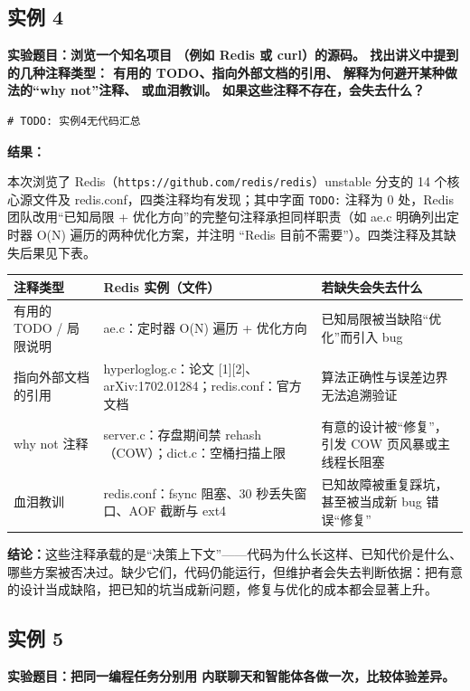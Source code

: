 \documentclass[12pt,a4paper]{article}
\newcounter{picnum}
\newcommand{\resetpic}{\setcounter{picnum}{0}}
\begin{document}
\subsection*{实例 4}
\resetpic
\textbf{实验题目：浏览一个知名项目
（例如 Redis 或 curl）的源码。 
找出讲义中提到的几种注释类型：
有用的 TODO、指向外部文档的引用、
解释为何避开某种做法的“why not”注释、
或血泪教训。 如果这些注释不存在，会失去什么？
}

\begin{lstlisting}
# TODO: 实例4无代码汇总
\end{lstlisting}

\textbf{结果：}

本次浏览了 Redis（\texttt{https://github.com/redis/redis}）unstable 分支的 14 个核心源文件及 redis.conf，四类注释均有发现；其中字面 \texttt{TODO:} 
注释为 0 处，Redis 团队改用``已知局限 + 优化方向''的完整句注释承担同样职责（如 ae.c 明确列出定时器 O(N) 遍历的两种优化方案，并注明 ``Redis 目前不需要''）。四类注释及其缺失后果见下表。

\begin{tabular}{p{2.8cm}p{4.6cm}p{5.4cm}}
\toprule
注释类型 & Redis 实例（文件） & 若缺失会失去什么 \\
\midrule
有用的 TODO / 局限说明 & ae.c：定时器 O(N) 遍历 + 优化方向 & 已知局限被当缺陷``优化''而引入 bug \\
\addlinespace
指向外部文档的引用 & hyperloglog.c：论文 [1][2]、arXiv:1702.01284；redis.conf：官方文档 & 算法正确性与误差边界无法追溯验证 \\
\addlinespace
why not 注释 & server.c：存盘期间禁 rehash（COW）；dict.c：空桶扫描上限 & 有意的设计被``修复''，引发 COW 页风暴或主线程长阻塞 \\
\addlinespace
血泪教训 & redis.conf：fsync 阻塞、30 秒丢失窗口、AOF 截断与 ext4 & 已知故障被重复踩坑，甚至被当成新 bug 错误``修复'' \\
\bottomrule
\end{tabular}

\textbf{结论：}这些注释承载的是``决策上下文''——代码为什么长这样、已知代价是什么、哪些方案被否决过。缺少它们，代码仍能运行，但维护者会失去判断依据：把有意的设计当成缺陷，把已知的坑当成新问题，修复与优化的成本都会显著上升。

\subsection*{实例 5}
\resetpic
\textbf{实验题目：把同一编程任务分别用
内联聊天和智能体各做一次，比较体验差异。}
\end{document}
